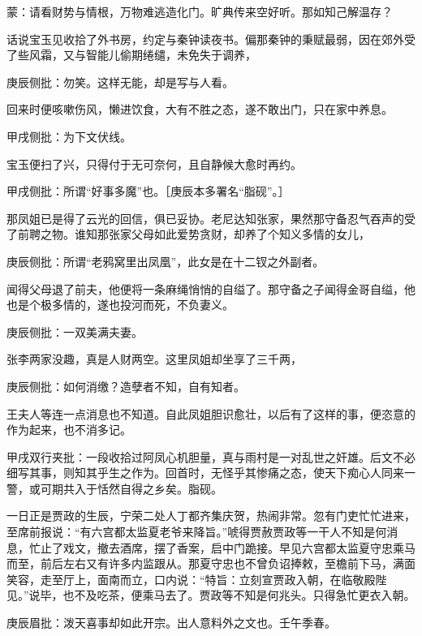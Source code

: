 \begin{parag}


    \begin{note}蒙：请看财势与情根，万物难逃造化门。旷典传来空好听。那如知己解温存？\end{note}
\end{parag}


\begin{parag}


    话说宝玉见收拾了外书房，约定与秦钟读夜书。偏那秦钟的秉赋最弱，因在郊外受了些风霜，又与智能儿偷期绻缱，未免失于调养，\begin{note}庚辰侧批：勿笑。这样无能，却是写与人看。\end{note}回来时便咳嗽伤风，懒进饮食，大有不胜之态，遂不敢出门，只在家中养息。\begin{note}甲戌侧批：为下文伏线。\end{note}宝玉便扫了兴，只得付于无可奈何，且自静候大愈时再约。\begin{note}甲戌侧批：所谓“好事多魔”也。［庚辰本多署名“脂砚”。］\end{note}
\end{parag}


\begin{parag}


    那凤姐已是得了云光的回信，俱已妥协。老尼达知张家，果然那守备忍气吞声的受了前聘之物。谁知那张家父母如此爱势贪财，却养了个知义多情的女儿，\begin{note}庚辰侧批：所谓“老鸦窝里出凤凰”，此女是在十二钗之外副者。\end{note}闻得父母退了前夫，他便将一条麻绳悄悄的自缢了。那守备之子闻得金哥自缢，他也是个极多情的，遂也投河而死，不负妻义。\begin{note}庚辰侧批：一双美满夫妻。\end{note}张李两家没趣，真是人财两空。这里凤姐却坐享了三千两，\begin{note}庚辰侧批：如何消缴？造孽者不知，自有知者。\end{note}王夫人等连一点消息也不知道。自此凤姐胆识愈壮，以后有了这样的事，便恣意的作为起来，也不消多记。\begin{note}甲戌双行夹批：一段收拾过阿凤心机胆量，真与雨村是一对乱世之奸雄。后文不必细写其事，则知其乎生之作为。回首时，无怪乎其惨痛之态，使天下痴心人同来一警，或可期共入于恬然自得之乡矣。脂砚。\end{note}
\end{parag}


\begin{parag}


    一日正是贾政的生辰，宁荣二处人丁都齐集庆贺，热闹非常。忽有门吏忙忙进来，至席前报说：“有六宫都太监夏老爷来降旨。”唬得贾赦贾政等一干人不知是何消息，忙止了戏文，撤去酒席，摆了香案，启中门跪接。早见六宫都太监夏守忠乘马而至，前后左右又有许多内监跟从。那夏守忠也不曾负诏捧敕，至檐前下马，满面笑容，走至厅上，面南而立，口内说：“特旨：立刻宣贾政入朝，在临敬殿陛见。”说毕，也不及吃茶，便乘马去了。贾政等不知是何兆头。只得急忙更衣入朝。\begin{note}庚辰眉批：泼天喜事却如此开宗。出人意料外之文也。壬午季春。\end{note}
\end{parag}


